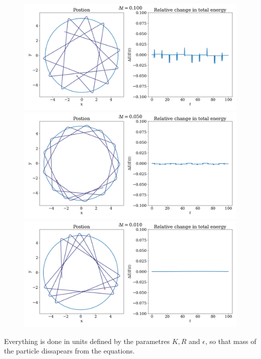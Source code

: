 \documentclass{article}
\begin{document}
        \begin{figure}
            
            \includegraphics[width = \textwidth]{one_particle_01}
            \includegraphics[width = \textwidth]{one_particle_005}
            \includegraphics[width = \textwidth]{one_particle_001}

        \end{figure}

        Everything is done in units defined by the parametres $K, R$ and $\epsilon$, so that mass of the particle dissapears from the equations.

        \paragraph*{}
        
\end{document}
